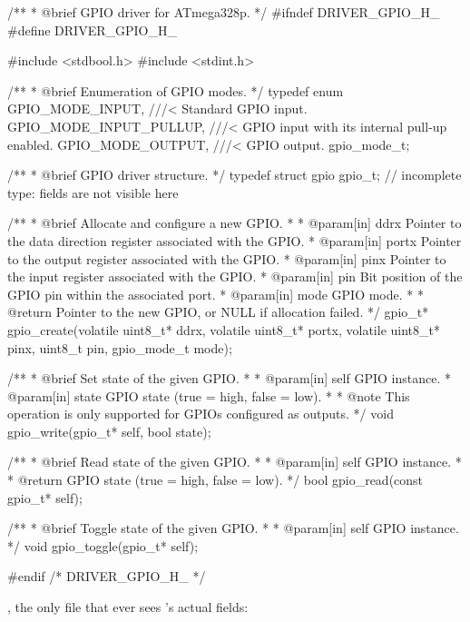 \begin{ccode}
/**
 * @brief GPIO driver for ATmega328p.
 */
#ifndef DRIVER_GPIO_H_
#define DRIVER_GPIO_H_

#include <stdbool.h>
#include <stdint.h>

/**
 * @brief Enumeration of GPIO modes.
 */
typedef enum
{
    GPIO_MODE_INPUT,        ///< Standard GPIO input.
    GPIO_MODE_INPUT_PULLUP, ///< GPIO input with its internal pull-up enabled.
    GPIO_MODE_OUTPUT,       ///< GPIO output.
} gpio_mode_t;

/**
 * @brief GPIO driver structure.
 */
typedef struct gpio gpio_t;   // incomplete type: fields are not visible here

/**
 * @brief Allocate and configure a new GPIO.
 *
 * @param[in] ddrx  Pointer to the data direction register associated with the GPIO.
 * @param[in] portx Pointer to the output register associated with the GPIO.
 * @param[in] pinx  Pointer to the input register associated with the GPIO.
 * @param[in] pin   Bit position of the GPIO pin within the associated port.
 * @param[in] mode  GPIO mode.
 *
 * @return Pointer to the new GPIO, or NULL if allocation failed.
 */
gpio_t* gpio_create(volatile uint8_t* ddrx, volatile uint8_t* portx, volatile uint8_t* pinx,
                     uint8_t pin, gpio_mode_t mode);

/**
 * @brief Set state of the given GPIO.
 *
 * @param[in] self  GPIO instance.
 * @param[in] state GPIO state (true = high, false = low).
 *
 * @note This operation is only supported for GPIOs configured as outputs.
 */
void gpio_write(gpio_t* self, bool state);

/**
 * @brief Read state of the given GPIO.
 *
 * @param[in] self GPIO instance.
 *
 * @return GPIO state (true = high, false = low).
 */
bool gpio_read(const gpio_t* self);

/**
 * @brief Toggle state of the given GPIO.
 *
 * @param[in] self GPIO instance.
 */
void gpio_toggle(gpio_t* self);

#endif /* DRIVER_GPIO_H_ */
\end{ccode}

\noindent{}, the only file that ever sees 's actual fields:

